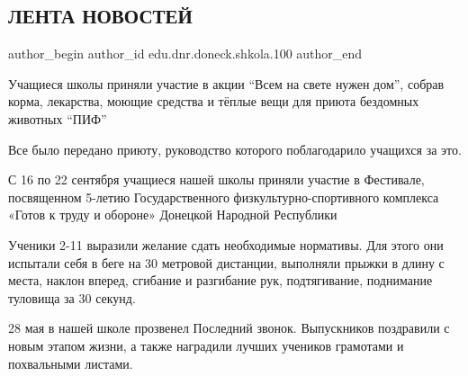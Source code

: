  
 
 
 
 
\subsection{ЛЕНТА НОВОСТЕЙ}
\label{sec:30_12_2021.edu.dnr.doneck.shkola.100.1.novosti}

\ifcmt
 author_begin
   author_id edu.dnr.doneck.shkola.100
 author_end
\fi



Учащиеся школы приняли участие в акции \enquote{Всем на свете нужен дом}, собрав корма,
лекарства, моющие средства и тёплые вещи для приюта бездомных животных \enquote{ПИФ}

Все было передано приюту, руководство которого поблагодарило  учащихся за это.


С 16 по 22 сентября учащиеся нашей школы приняли участие в Фестивале,
посвященном 5-летию Государственного физкультурно-спортивного комплекса «Готов
к труду и обороне» Донецкой Народной Республики

Ученики 2-11 выразили желание сдать необходимые нормативы. Для этого они
испытали себя в беге на 30 метровой дистанции, выполняли прыжки в длину с
места, наклон вперед, сгибание и разгибание рук, подтягивание, поднимание
туловища за 30 секунд.



28 мая в нашей школе прозвенел Последний звонок. Выпускников поздравили с новым
этапом жизни, а также наградили лучших учеников грамотами и похвальными
листами. 

